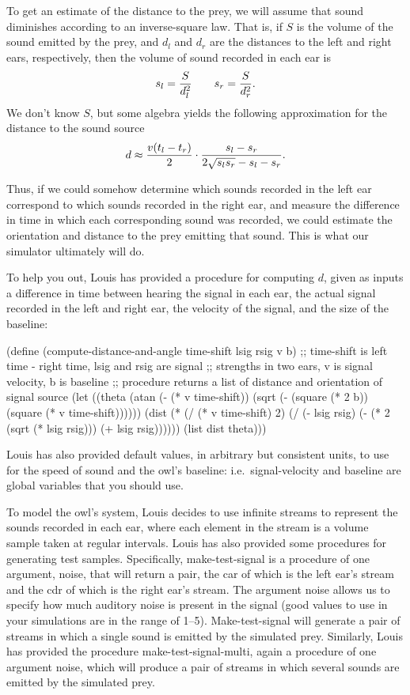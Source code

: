 To get an estimate of the distance to the prey, we will assume that
sound diminishes according to an inverse-square law.  That is, if $S$ is
the volume of the sound emitted by the prey, and $d_l$ and $d_r$ are the
distances to the left and right ears, respectively, then the volume of
sound recorded in each ear is
\[s_l = {S \over {d_l^2}} \qquad s_r = {S \over d_r^2}.\]
We don't know $S$, but some algebra yields the following
approximation for the 
distance to the sound source 
\[d \approx {{{v(t_l - t_r)} \over 2} \cdot {{s_l - s_r} \over {2\sqrt{s_l
s_r} - s_l - s_r}}}.\]

Thus, if we could somehow determine which sounds recorded in the left
ear correspond to which sounds recorded in the right ear, and measure the
difference in time in which each corresponding sound was recorded, we could
estimate the orientation and distance to the prey emitting that sound. This is
what our simulator ultimately will do.

To help you out, Louis has provided a procedure for computing $d$,
given as inputs a difference in time between hearing the signal in each
ear, the actual signal recorded in the left and right ear, the velocity
of the signal, and the size of the baseline:

\beginlisp
(define (compute-distance-and-angle time-shift lsig rsig v b)
   ;; time-shift is left time - right time, lsig and rsig are signal
   ;; strengths in two ears, v is signal velocity, b is baseline
   ;; procedure returns a list of distance and orientation of signal source
   (let ((theta (atan (- (* v time-shift))
                      (sqrt (- (square (* 2 b))
                               (square (* v time-shift))))))
         (dist (* (/ (* v time-shift) 2)
                  (/ (- lsig rsig)
                     (- (* 2 (sqrt (* lsig rsig)))
                        (+ lsig rsig))))))
    (list dist theta)))
\endlisp

Louis has also provided default values, in arbitrary but consistent
units,  to use for the speed of sound and the owl's baseline:
i.e.~{\cf signal-velocity} and {\cf baseline} are global variables
that you should use. 

To model the owl's system, Louis decides to use infinite streams to
represent the sounds recorded in each ear, where each element in the
stream is a volume sample taken at regular intervals.  Louis has also
provided some procedures for generating test samples.  Specifically, 
{\cf make-test-signal} is a procedure of one argument, {\cf noise}, that
will return a pair, the {\cf car} of which is the left ear's stream and
the {\cf cdr} of which is the right ear's stream.  The argument {\cf
noise} allows us to specify how much auditory noise is present in the
signal (good values to use in your simulations are in the range of
1--5).  {\cf Make-test-signal} will generate a pair of streams in which
a single sound is emitted by the simulated prey.  Similarly, Louis has
provided the procedure  
{\cf make-test-signal-multi}, again a procedure of one argument {\cf
noise}, which will produce a pair of streams in which several
sounds are emitted by the simulated prey.


